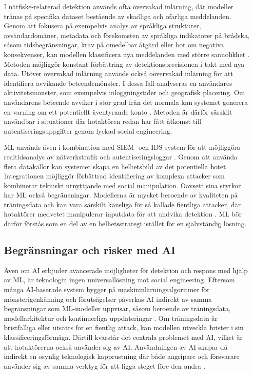 I nätfiske-relaterad detektion används ofta övervakad inlärning, där modeller tränas på specifika dataset bestående av skadliga och ofarliga meddelanden. Genom att fokusera på exempelvis 
analys av språkliga strukturer, avsändardomäner, metadata och förekomsten av språkliga indikatorer på brådska, såsom tidsbegränsningar, krav på omedelbar åtgärd eller hot om negativa konsekvenser, 
kan modellen klassificera nya meddelanden med större sannolikhet \cite{basnet2023anti_phishing}. Metoden möjliggör konstant förbättring av detektionsprecisionen i takt med nya data. Utöver övervakad 
inlärning används också oövervakad inlärning för att identifiera avvikande beteendemönster. I dessa fall analyseras en användares aktivitetsmönster, som exempelvis inloggningstider och geografisk placering. 
Om användarens beteende avviker i stor grad från det normala kan systemet generera en varning om ett potentiellt äventyrande konto \cite{siem_comprehensive_study_2022}. Metoden är därför särskilt användbar i 
situationer där hotaktören redan har fått åtkomst till autentiseringsuppgifter genom lyckad social engineering.  

ML används även i kombination med SIEM- och IDS-system för att möjliggöra realtidsanalys av nätverkstrafik och autentiseringsloggar \cite{siem_comprehensive_study_2022}. Genom att använda flera datakällor 
kan systemet skapa en helhetsbild av det potentiella hotet. Integrationen möjliggör förbättrad identifiering av komplexa attacker som kombinerar tekniskt utnyttjande med social manipulation. Oavsett sina styrkor 
har ML också begränsningar. Modellerna är mycket beroende av kvaliteten på träningsdata och kan vara särskilt känsliga för så kallade fientliga attacker, där hotaktörer medvetet manipulerar inputdata för att undvika 
detektion \cite{algarni2024comprehensive_taxonomy}. ML bör därför förstås som en del av en helhetsstrategi istället för en självständig lösning.

\subsection{Begränsningar och risker med AI}
Även om AI erbjuder avancerade möjligheter för detektion och respons med hjälp av ML, är teknologin ingen universallösning mot social engineering. Eftersom många AI-baserade system bygger på maskininlärningsalgoritmer för mönsterigenkänning och förutsägelser påverkas AI 
indirekt av samma begränsningar som ML-modeller uppvisar, såsom beroende av träningsdata, modellarkitektur och kontinuerliga uppdateringar \cite{basnet2023anti_phishing, zhang2024digital_deception}. Om träningsdata är bristfälliga eller utsätts för en fientlig attack, kan modellen utveckla brister i 
sin klassificeringsförmåga. Därtill kvarstår det centrala problemet med AI, vilket är att hotaktörerna också använder sig av AI. Användningen av AI 
skapar då indirekt en osynlig teknologisk kapprustning där både angripare och försvarare använder sig av samma verktyg för att ligga steget före den andra \cite{zhang2024digital_deception}.

